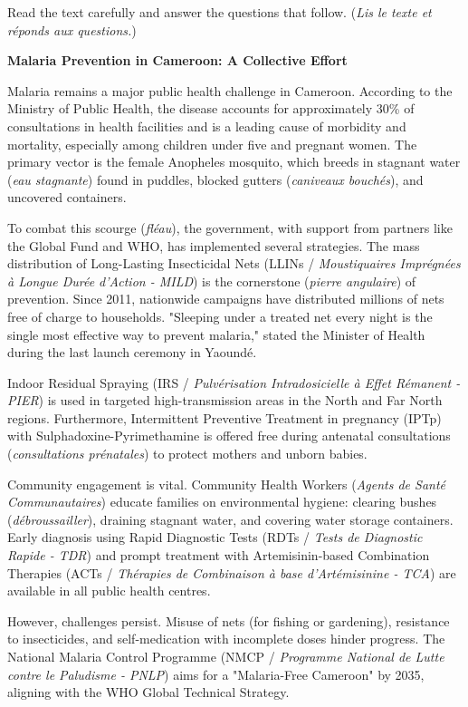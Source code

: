 \documentclass[11pt]{article}
\begin{document}
\begin{exercice}
Read the text carefully and answer the questions that follow. (\emph{Lis le texte et réponds aux questions.})

\textbf{Malaria Prevention in Cameroon: A Collective Effort}

Malaria remains a major public health challenge in Cameroon. According to the Ministry of Public Health, the disease accounts for approximately 30\% of consultations in health facilities and is a leading cause of morbidity and mortality, especially among children under five and pregnant women. The primary vector is the female Anopheles mosquito, which breeds in stagnant water (\textit{eau stagnante}) found in puddles, blocked gutters (\textit{caniveaux bouchés}), and uncovered containers.

To combat this scourge (\textit{fléau}), the government, with support from partners like the Global Fund and WHO, has implemented several strategies. The mass distribution of Long-Lasting Insecticidal Nets (LLINs / \textit{Moustiquaires Imprégnées à Longue Durée d'Action - MILD}) is the cornerstone (\textit{pierre angulaire}) of prevention. Since 2011, nationwide campaigns have distributed millions of nets free of charge to households. "Sleeping under a treated net every night is the single most effective way to prevent malaria," stated the Minister of Health during the last launch ceremony in Yaoundé.

Indoor Residual Spraying (IRS / \textit{Pulvérisation Intradosicielle à Effet Rémanent - PIER}) is used in targeted high-transmission areas in the North and Far North regions. Furthermore, Intermittent Preventive Treatment in pregnancy (IPTp) with Sulphadoxine-Pyrimethamine is offered free during antenatal consultations (\textit{consultations prénatales}) to protect mothers and unborn babies.

Community engagement is vital. Community Health Workers (\textit{Agents de Santé Communautaires}) educate families on environmental hygiene: clearing bushes (\textit{débroussailler}), draining stagnant water, and covering water storage containers. Early diagnosis using Rapid Diagnostic Tests (RDTs / \textit{Tests de Diagnostic Rapide - TDR}) and prompt treatment with Artemisinin-based Combination Therapies (ACTs / \textit{Thérapies de Combinaison à base d'Artémisinine - TCA}) are available in all public health centres.

However, challenges persist. Misuse of nets (for fishing or gardening), resistance to insecticides, and self-medication with incomplete doses hinder progress. The National Malaria Control Programme (NMCP / \textit{Programme National de Lutte contre le Paludisme - PNLP}) aims for a "Malaria-Free Cameroon" by 2035, aligning with the WHO Global Technical Strategy.


\end{exercice}
\end{document}
